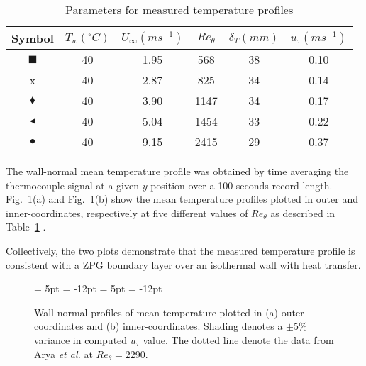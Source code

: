 \begin{table}[h]
\caption{Parameters for measured temperature profiles}
\centering
\begin{tabular}{|c|c|c|c|c|c|}
\hline 
Symbol & $T_{w} (^\circ C)$ & $U_{\infty} (ms^{-1})$ & $Re_{\theta}$ & $\delta_T (mm)$ & $u_\tau (ms^{-1})$\\ 
\hline 
\color{red}$\blacksquare$ & 40 & 1.95 & 568 & 38 & 0.10\\ 
\hline 
{\color{blue} x} & 40 & 2.87 & 825 & 34 & 0.14\\ 
\hline 
{\color{green} $\blacklozenge$} & 40 & 3.90 & 1147 & 34 & 0.17\\
\hline
{\color{magenta} $\blacktriangleleft$} & 40 & 5.04 & 1454 & 33 & 0.22\\
\hline
{\color{cyan} $\bullet$} & 40 & 9.15 & 2415 & 29 & 0.37\\
\hline
\end{tabular}%
\label{tab:temp}
\end{table}

The wall-normal mean temperature profile was obtained by time averaging the thermocouple signal at a given $y$-position over a 100 seconds record length. 
Fig.~\ref{fig:ZPG-temp}(a) and Fig.~\ref{fig:ZPG-temp}(b) show the mean temperature profiles plotted in outer and inner-coordinates, respectively at five different values of $Re_\theta$ as described in Table~\ref{tab:temp} . 

Collectively, the two plots demonstrate that the measured temperature profile is consistent with a ZPG boundary layer over an isothermal wall with heat transfer.  

\begin{figure}[t!]
  \begin{center}
  {\subfigcapskip = 5pt \subfigcapmargin = -12pt }
   {\subfigcapskip = 5pt \subfigcapmargin = -12pt  }
  \end{center}
 \caption{Wall-normal profiles of mean temperature plotted in (a) outer-coordinates and (b) inner-coordinates. Shading denotes a $\pm 5\%$ variance in computed $u_\tau$ value. The dotted line denote the data from  Arya \textit{et al.} \cite{Araya2012} at $Re_\theta=2290$.}

\label{fig:ZPG-temp}
\end{figure}

